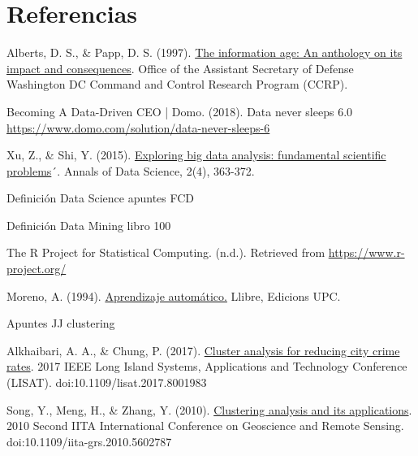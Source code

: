 \documentclass[3p,twocolumn]{elsarticle}
\begin{document}
\clearpage

\section{Referencias}
\renewcommand{\section}[2]{}
\begin{thebibliography}{X}

 Alberts, D. S., \& Papp, D. S. (1997). \href{http://www.dodccrp.org/files/Alberts_Anthology_I.pdf} {The information age: An anthology on its impact and consequences}. Office of the Assistant Secretary of Defense Washington DC Command and Control Research Program (CCRP).

 Becoming A Data-Driven CEO | Domo. (2018). Data never sleeps 6.0 \href{https://www.domo.com/solution/data-never-sleeps-6} {https://www.domo.com/solution/data-never-sleeps-6}

 Xu, Z., \& Shi, Y. (2015). \href {https://link.springer.com/content/pdf/10.1007/s40745-015-0063-7.pdf} {Exploring big data analysis: fundamental scientific problems}´. Annals of Data Science, 2(4), 363-372.

 Definición Data Science apuntes FCD

 Definición Data Mining libro 100

 The R Project for Statistical Computing. (n.d.). Retrieved from \href{https://www.r-project.org/} {https://www.r-project.org/}

 Moreno, A. (1994). \href{https://upcommons.upc.edu/bitstream/handle/2099.3/36157/9788483019962.pdf?sequence=1&isAllowed=y} {Aprendizaje automático.} Llibre, Edicions UPC.

 Apuntes JJ clustering

 Alkhaibari, A. A., \& Chung, P. (2017). \href{https://ieeexplore.ieee.org/document/8001983} {Cluster analysis for reducing city crime rates}. 2017 IEEE Long Island Systems, Applications and Technology Conference (LISAT). doi:10.1109/lisat.2017.8001983

 Song, Y., Meng, H., \& Zhang, Y. (2010). \href{https://ieeexplore.ieee.org/document/5602787} {Clustering analysis and its applications}. 2010 Second IITA International Conference on Geoscience and Remote Sensing. doi:10.1109/iita-grs.2010.5602787


\end{thebibliography}
\end{document}
